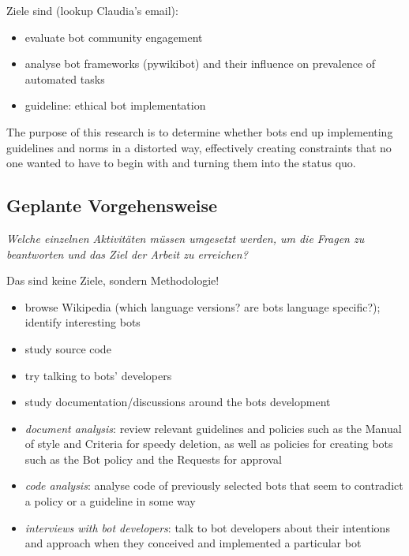 \documentclass[pdftex,a4paper,11pt]{scrartcl}
\begin{document}
Ziele sind (lookup Claudia's email):
\begin{itemize}
    \item evaluate bot community engagement
    \item analyse bot frameworks (pywikibot) and their influence on prevalence of automated tasks
    \item guideline: ethical bot implementation

\end{itemize}
The purpose of this research is to determine whether bots end up implementing guidelines and norms in a distorted way, effectively creating constraints that no one wanted to have to begin with and turning them into the status quo.



\subsection{Geplante Vorgehensweise}
\noindent \emph{Welche einzelnen Aktivitäten müssen umgesetzt werden, um die Fragen zu beantworten und das Ziel der Arbeit zu erreichen?}
\begin{comment}
\begin{itemize}
	\item Aus den Fragen (vorheriger Abschnitt) können Sie dann Aktivitäten ableiten, die Ihnen helfen, Ihre weitere Arbeit zu strukturieren.
\end{itemize}
\end{comment}

Das sind keine Ziele, sondern Methodologie!
\begin{itemize}
  \item browse Wikipedia (which language versions? are bots language specific?); identify interesting bots
  \item study source code
  \item try talking to bots' developers
  \item study documentation/discussions around the bots development
\end{itemize}

\begin{itemize}
  \item \emph{document analysis}: review relevant guidelines and policies such as the Manual of style and Criteria for speedy deletion, as well as policies for creating bots such as the Bot policy and the Requests for approval
  \item \emph{code analysis}: analyse code of previously selected bots that seem to contradict a policy or a guideline in some way
  \item \emph{interviews with bot developers}: talk to bot developers about their intentions and approach when they conceived and implemented a particular bot
\end{itemize}
\end{document}
